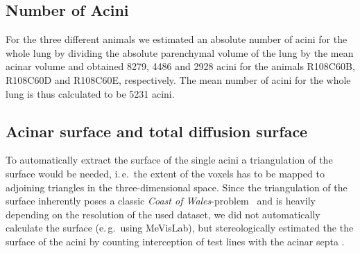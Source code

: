 \documentclass[twoside,paper=a4,abstract=true,english,DIV=calc]{scrartcl}
\newcommand{\ie}{i.\,e.\ }
\newcommand{\eg}{e.\,g.\ }
\begin{document}
\subsection{Number of Acini}

For the three different animals we estimated an absolute number of acini for the whole lung by dividing the absolute parenchymal volume of the lung by the mean acinar volume and obtained 8279, 4486 and 2928 acini for the animals R108C60B, R108C60D and R108C60E, respectively. The mean number of acini for the whole lung is thus calculated to be 5231 acini. 

\subsection{Acinar surface and total diffusion surface}

%
%
To automatically extract the surface of the single acini a triangulation of the surface would be needed, \ie the extent of the voxels has to be mapped to adjoining triangles in the three-dimensional space. Since the triangulation of the surface inherently poses a classic \emph{Coast of Wales}-problem~\cite{Mandelbrot1967a} and is heavily depending on the resolution of the used dataset, we did not automatically calculate the surface (\eg using MeVisLab), but stereologically estimated the the surface of the acini by counting interception of test lines with the acinar septa \cite{Hsia2010}.
\end{document}
